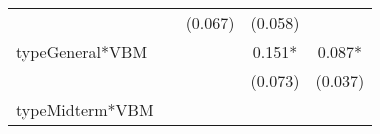 \documentclass[12pt,twoside]{reedthesis}
\begin{document}
\begin{longtable}[]{@{}lcccc@{}}
\begin{minipage}[t]{0.12\columnwidth}
  \strut
  \end{minipage} & \begin{minipage}[t]{0.13\columnwidth}\centering\strut
  \strut
  \end{minipage} & \begin{minipage}[t]{0.14\columnwidth}\centering\strut
  (0.067)\strut
  \end{minipage} & \begin{minipage}[t]{0.14\columnwidth}\centering\strut
  (0.058)\strut
  \end{minipage}\tabularnewline
  \begin{minipage}[t]{0.26\columnwidth}\raggedright\strut
  typeGeneral*VBM\strut
  \end{minipage} & \begin{minipage}[t]{0.12\columnwidth}\centering\strut
  \strut
  \end{minipage} & \begin{minipage}[t]{0.13\columnwidth}\centering\strut
  \strut
  \end{minipage} & \begin{minipage}[t]{0.14\columnwidth}\centering\strut
  0.151*\strut
  \end{minipage} & \begin{minipage}[t]{0.14\columnwidth}\centering\strut
  0.087*\strut
  \end{minipage}\tabularnewline
  \begin{minipage}[t]{0.26\columnwidth}\raggedright\strut
  \strut
  \end{minipage} & \begin{minipage}[t]{0.12\columnwidth}\centering\strut
  \strut
  \end{minipage} & \begin{minipage}[t]{0.13\columnwidth}\centering\strut
  \strut
  \end{minipage} & \begin{minipage}[t]{0.14\columnwidth}\centering\strut
  (0.073)\strut
  \end{minipage} & \begin{minipage}[t]{0.14\columnwidth}\centering\strut
  (0.037)\strut
  \end{minipage}\tabularnewline
  \begin{minipage}[t]{0.26\columnwidth}\raggedright\strut
  typeMidterm*VBM\strut
  \end{minipage} & \begin{minipage}[t]{0.12\columnwidth}\centering\strut
  \strut
  \end{minipage} & \begin{minipage}[t]{0.13\columnwidth}\centering\strut

\end{minipage}
\end{longtable}
\end{document}
